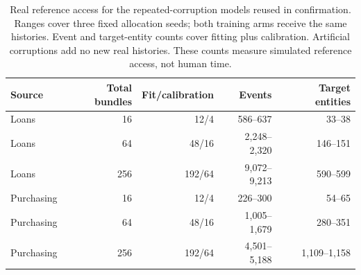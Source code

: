 \begin{table}[t]
\centering\small
\caption{Real reference access for the repeated-corruption models reused in confirmation. Ranges cover three fixed allocation seeds; both training arms receive the same histories. Event and target-entity counts cover fitting plus calibration. Artificial corruptions add no new real histories. These counts measure simulated reference access, not human time.}
\label{tab:annotation-cost}
\begin{tabular}{lrrrr}
\toprule
Source & Total bundles & Fit/calibration & Events & Target entities \\ \midrule
Loans & 16 & 12/4 & 586--637 & 33--38 \\
Loans & 64 & 48/16 & 2,248--2,320 & 146--151 \\
Loans & 256 & 192/64 & 9,072--9,213 & 590--599 \\
Purchasing & 16 & 12/4 & 226--300 & 54--65 \\
Purchasing & 64 & 48/16 & 1,005--1,679 & 280--351 \\
Purchasing & 256 & 192/64 & 4,501--5,188 & 1,109--1,158 \\
\bottomrule
\end{tabular}
\end{table}
